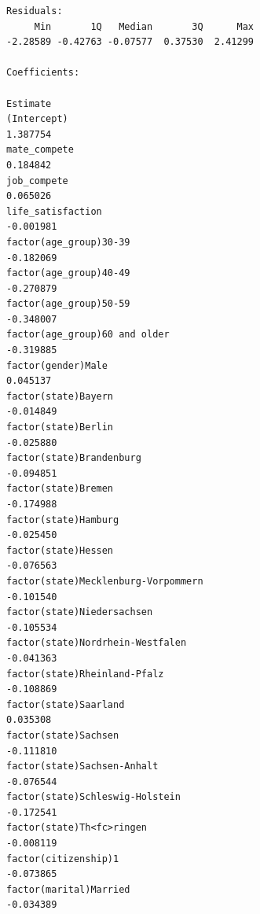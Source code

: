 \documentclass[
]{article}
\begin{document}
\begin{table}
\begin{minipage}[t]{\linewidth}
{\begin{verbatim}
Residuals:
     Min       1Q   Median       3Q      Max 
-2.28589 -0.42763 -0.07577  0.37530  2.41299 

Coefficients:
                                                                                   Estimate
(Intercept)                                                                        1.387754
mate_compete                                                                       0.184842
job_compete                                                                        0.065026
life_satisfaction                                                                 -0.001981
factor(age_group)30-39                                                            -0.182069
factor(age_group)40-49                                                            -0.270879
factor(age_group)50-59                                                            -0.348007
factor(age_group)60 and older                                                     -0.319885
factor(gender)Male                                                                 0.045137
factor(state)Bayern                                                               -0.014849
factor(state)Berlin                                                               -0.025880
factor(state)Brandenburg                                                          -0.094851
factor(state)Bremen                                                               -0.174988
factor(state)Hamburg                                                              -0.025450
factor(state)Hessen                                                               -0.076563
factor(state)Mecklenburg-Vorpommern                                               -0.101540
factor(state)Niedersachsen                                                        -0.105534
factor(state)Nordrhein-Westfalen                                                  -0.041363
factor(state)Rheinland-Pfalz                                                      -0.108869
factor(state)Saarland                                                              0.035308
factor(state)Sachsen                                                              -0.111810
factor(state)Sachsen-Anhalt                                                       -0.076544
factor(state)Schleswig-Holstein                                                   -0.172541
factor(state)Th<fc>ringen                                                         -0.008119
factor(citizenship)1                                                              -0.073865
factor(marital)Married                                                            -0.034389

\end{verbatim}}
\end{minipage}
\end{table}
\end{document}
